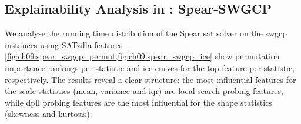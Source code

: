 \FloatBarrier

\subsection{Explainability Analysis in : Spear-SWGCP}

We analyse the running time distribution of the Spear \gls{sat} solver on the \Gls{swgcp}~\citep{GenEtAl99} instances using SATzilla features~\citep{HutEtAl14,ShaHoo24}.
\cref{fig:ch09:spear_swgcp_permut,fig:ch09:spear_swgcp_ice} show permutation importance rankings per statistic and \gls{ice} curves for the top feature per statistic, respectively.
The results reveal a clear structure: the most influential features for the scale statistics (mean, variance and \gls{iqr}) are local search probing features, while \gls{dpll} probing features are the most influential for the shape statistics (skewness and kurtosis).

